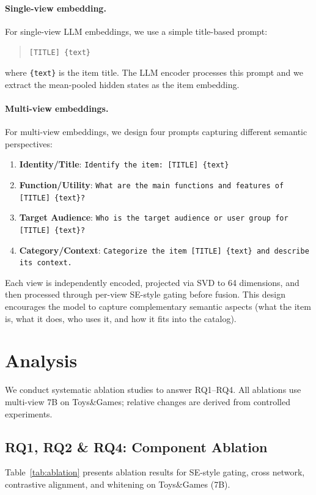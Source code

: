 \documentclass[sigconf,natbib=true,anonymous]{acmart}
\begin{document}
\paragraph{Single-view embedding.}
For single-view LLM embeddings, we use a simple title-based
prompt:
\begin{quote}
\texttt{[TITLE] \{text\}}
\end{quote}
where \texttt{\{text\}} is the item title. The LLM encoder
processes this prompt and we extract the mean-pooled hidden
states as the item embedding.

\paragraph{Multi-view embeddings.}
For multi-view embeddings, we design four prompts capturing
different semantic perspectives:
\begin{enumerate}[leftmargin=*,itemsep=1pt]
  \item \textbf{Identity/Title}:
    \texttt{Identify the item: [TITLE] \{text\}}
  \item \textbf{Function/Utility}:
    \texttt{What are the main functions and features of
    [TITLE] \{text\}?}
  \item \textbf{Target Audience}:
    \texttt{Who is the target audience or user group for
    [TITLE] \{text\}?}
  \item \textbf{Category/Context}:
    \texttt{Categorize the item [TITLE] \{text\} and describe
    its context.}
\end{enumerate}
Each view is independently encoded, projected via SVD to 64
dimensions, and then processed through per-view SE-style gating
before fusion.
This design encourages the model to capture complementary
semantic aspects (what the item is, what it does, who uses
it, and how it fits into the catalog).

\section{Analysis}\label{sec:analysis}

We conduct systematic ablation studies to answer RQ1--RQ4.
All ablations use multi-view 7B on Toys\&Games; relative changes
are derived from controlled experiments.
\subsection{RQ1, RQ2 \& RQ4: Component Ablation}

Table~\ref{tab:ablation} presents ablation results for SE-style gating,
cross network, contrastive alignment, and whitening on Toys\&Games (7B).
\end{document}
